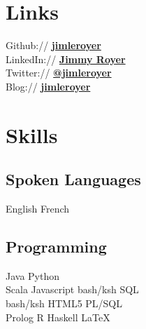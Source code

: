 \documentclass[letterpaper]{deedy-resume} %
\begin{document}
\begin{minipage}[t]{0.33\textwidth} %


\section{Links} 

Github:// \href{https://github.com/jimleroyer/}{\bf jimleroyer} \\
LinkedIn:// \href{https://ca.linkedin.com/in/jimleroyer/}{\bf Jimmy Royer} \\
Twitter:// \href{https://twitter.com/jimleroyer}{\bf @jimleroyer} \\
Blog:// \href{http://jimleroyer.wordpress.com/}{\bf jimleroyer}

\sectionspace %


\section{Skills}

\subsection{Spoken Languages}

English \textbullet{} French

\sectionspace %

\subsection{Programming}

Java \textbullet{} Python \\
Scala \textbullet{} Javascript \textbullet bash/ksh \textbullet{} SQL \\
bash/ksh \textbullet{} HTML5 \textbullet{} PL/SQL \\
Prolog \textbullet{} R \textbullet{} Haskell \textbullet{} \LaTeX\

\sectionspace %


\end{minipage}
\end{document}
